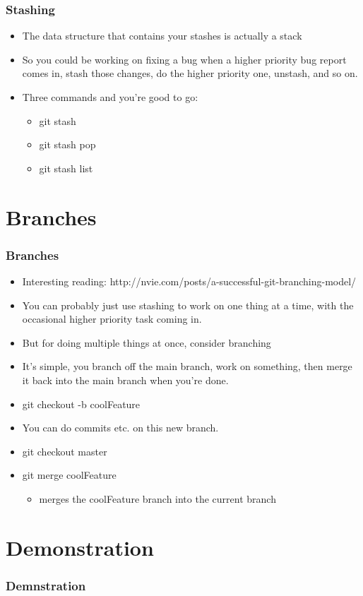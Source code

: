 \documentclass{beamer}
\begin{document}
\begin{frame}
\frametitle{Stashing}
\begin{itemize}
\pause
\item The data structure that contains your stashes is actually a stack
\pause
\item So you could be working on fixing a bug when a higher priority bug report
comes in, stash those changes, do the higher priority one, unstash, and so on.
\pause
\item Three commands and you're good to go:
	\begin{itemize}
	\pause
	\item git stash
	\pause
	\item git stash pop
	\pause
	\item git stash list
	\end{itemize}
\end{itemize}
\end{frame}


\section{Branches}
\begin{frame}
\frametitle{Branches}
\begin{itemize}
\pause
\item Interesting reading: http://nvie.com/posts/a-successful-git-branching-model/
\pause
\item You can probably just use stashing to work on one thing at a time, with
the occasional higher priority task coming in.
\pause
\item But for doing multiple things at once, consider branching
\pause
\item It's simple, you branch off the main branch, work on something, then merge
it back into the main branch when you're done.
\pause
\item git checkout -b coolFeature
\pause
\item You can do commits etc. on this new branch.
\pause
\item git checkout master
\pause
\item git merge coolFeature
	\begin{itemize}
	\pause
	\item merges the coolFeature branch into the current branch
	\end{itemize}
\end{itemize}
\end{frame}


\section{Demonstration}
\begin{frame}
\frametitle{Demnstration}
\end{frame}
\end{document}
